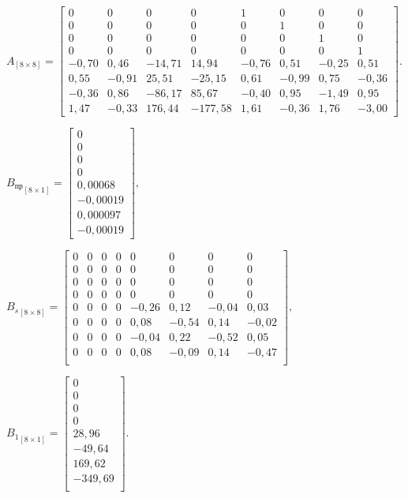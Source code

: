 $
A_{[8 \times 8]} = 
\begin{bmatrix}
 0     & 0     & 0      & 0       & 1     & 0     & 0     & 0     \\
 0     & 0     & 0      & 0       & 0     & 1     & 0     & 0     \\
 0     & 0     & 0      & 0       & 0     & 0     & 1     & 0     \\ 
 0     & 0     & 0      & 0       & 0     & 0     & 0     & 1     \\
 -0,70 & 0,46  & -14,71 & 14,94   & -0,76 & 0,51  & -0,25 & 0,51  \\
 0,55  & -0,91 & 25,51  & -25,15  & 0,61  & -0,99 & 0,75  & -0,36 \\
 -0,36 & 0,86  & -86,17 & 85,67   & -0,40 & 0,95  & -1,49 & 0,95  \\
 1,47  & -0,33 & 176,44 & -177,58 & 1,61  & -0,36 & 1,76  & -3,00
\end{bmatrix}.
$
\bigskip

$
{B_\text{пр}}_{[8 \times 1]} = 
\begin{bmatrix}
0        \\
0        \\
0        \\
0        \\
0,00068  \\
-0,00019 \\
0,000097 \\
-0,00019
\end{bmatrix}, 
$
\bigskip

$
{B_s}_{[8 \times 8]} = 
\begin{bmatrix}
 0 & 0 & 0 & 0 & 0     & 0     & 0     & 0     \\
 0 & 0 & 0 & 0 & 0     & 0     & 0     & 0     \\
 0 & 0 & 0 & 0 & 0     & 0     & 0     & 0     \\ 
 0 & 0 & 0 & 0 & 0     & 0     & 0     & 0     \\
 0 & 0 & 0 & 0 & -0,26 & 0,12  & -0,04 & 0,03  \\
 0 & 0 & 0 & 0 & 0,08  & -0,54 & 0,14  & -0,02 \\
 0 & 0 & 0 & 0 & -0,04 & 0,22  & -0,52 & 0,05  \\ 
 0 & 0 & 0 & 0 & 0,08  & -0,09 & 0,14  & -0,47 \\
\end{bmatrix}, 
$
\bigskip

$
{B_1}_{[8 \times 1]} = 
\begin{bmatrix}
 0       \\
 0       \\
 0       \\
 0       \\
 28,96   \\
 -49,64  \\
 169,62  \\
 -349,69 \\
\end{bmatrix}.
$

